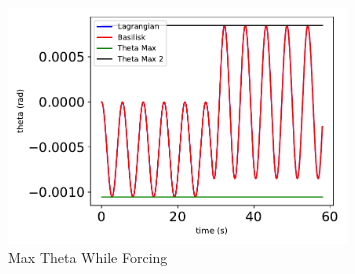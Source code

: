 \begin{figure}[htbp]\centerline{\includegraphics[width=0.8\textwidth]{AutoTeX/MaxThetaWhileForcing}}\caption{Max Theta While Forcing}\label{fig:MaxThetaWhileForcing}\end{figure}